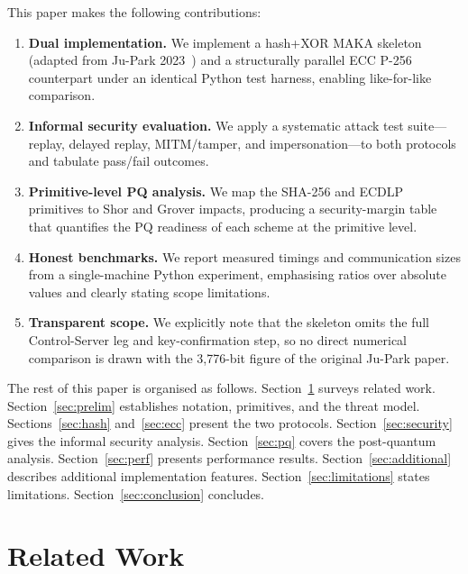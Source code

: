 \documentclass[journal]{IEEEtran}
\begin{document}
This paper makes the following contributions:

\begin{enumerate}
  \item \textbf{Dual implementation.} We implement a hash+XOR MAKA skeleton
    (adapted from Ju-Park 2023~\cite{JuPark2023}) and a structurally parallel
    ECC P-256 counterpart under an identical Python test harness, enabling
    like-for-like comparison.

  \item \textbf{Informal security evaluation.} We apply a systematic attack
    test suite---replay, delayed replay, MITM/tamper, and impersonation---to
    both protocols and tabulate pass/fail outcomes.

  \item \textbf{Primitive-level PQ analysis.} We map the SHA-256 and ECDLP
    primitives to Shor and Grover impacts, producing a security-margin table
    that quantifies the PQ readiness of each scheme at the primitive level.

  \item \textbf{Honest benchmarks.} We report measured timings and
    communication sizes from a single-machine Python experiment, emphasising
    ratios over absolute values and clearly stating scope limitations.

  \item \textbf{Transparent scope.} We explicitly note that the skeleton omits
    the full Control-Server leg and key-confirmation step, so no direct
    numerical comparison is drawn with the 3,776-bit figure of the original
    Ju-Park paper.
\end{enumerate}

The rest of this paper is organised as follows.
Section~\ref{sec:related} surveys related work.
Section~\ref{sec:prelim} establishes notation, primitives, and the threat
model.
Sections~\ref{sec:hash} and~\ref{sec:ecc} present the two protocols.
Section~\ref{sec:security} gives the informal security analysis.
Section~\ref{sec:pq} covers the post-quantum analysis.
Section~\ref{sec:perf} presents performance results.
Section~\ref{sec:additional} describes additional implementation features.
Section~\ref{sec:limitations} states limitations.
Section~\ref{sec:conclusion} concludes.

\section{Related Work}
\label{sec:related}
\end{document}
